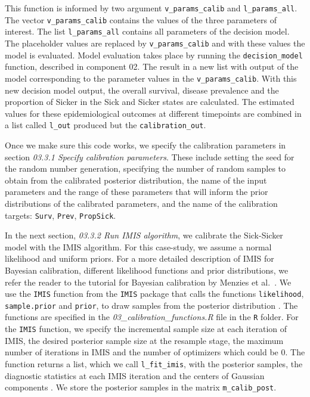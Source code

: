 \documentclass[]{book}
\begin{document}
This function is informed by two argument \texttt{v\_params\_calib} and \texttt{l\_params\_all}. The vector \texttt{v\_params\_calib} contains the values of the three parameters of interest. The list \texttt{l\_params\_all} contains all parameters of the decision model. The placeholder values are replaced by \texttt{v\_params\_calib} and with these values the model is evaluated. Model evaluation takes place by running the \texttt{decision\_model} function, described in component 02. The result in a new list with output of the model corresponding to the parameter values in the \texttt{v\_params\_calib}. With this new decision model output, the overall survival, disease prevalence and the proportion of Sicker in the Sick and Sicker states are calculated. The estimated values for these epidemiological outcomes at different timepoints are combined in a list called \texttt{l\_out} produced but the \texttt{calibration\_out}.

Once we make sure this code works, we specify the calibration parameters in section \emph{03.3.1 Specify calibration parameters}. These include setting the seed for the random number generation, specifying the number of random samples to obtain from the calibrated posterior distribution, the name of the input parameters and the range of these parameters that will inform the prior distributions of the calibrated parameters, and the name of the calibration targets: \texttt{Surv}, \texttt{Prev}, \texttt{PropSick}.

In the next section, \emph{03.3.2 Run IMIS algorithm}, we calibrate the Sick-Sicker model with the IMIS algorithm. For this case-study, we assume a normal likelihood and uniform priors. For a more detailed description of IMIS for Bayesian calibration, different likelihood functions and prior distributions, we refer the reader to the tutorial for Bayesian calibration by Menzies et al.~\citep{Menzies2017}. We use the \texttt{IMIS} function from the \texttt{IMIS} package that calls the functions \texttt{likelihood}, \texttt{sample.prior} and \texttt{prior}, to draw samples from the posterior distribution \citep{IMIS}. The functions are specified in the \emph{03\_calibration\_functions.R} file in the \texttt{R} folder. For the \texttt{IMIS} function, we specify the incremental sample size at each iteration of IMIS, the desired posterior sample size at the resample stage, the maximum number of iterations in IMIS and the number of optimizers which could be 0. The function returns a list, which we call \texttt{l\_fit\_imis}, with the posterior samples, the diagnostic statistics at each IMIS iteration and the centers of Gaussian components \citep{IMIS}. We store the posterior samples in the matrix \texttt{m\_calib\_post}.
\end{document}
